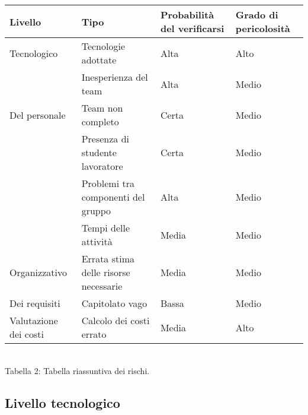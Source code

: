 \begin{center}
	\begin{tabular}{| >{\centering\arraybackslash}m{1in} | >{\centering\arraybackslash}m{1in} | >{\centering\arraybackslash}m{1in} | >{\centering\arraybackslash}m{1in} |}
		\hline
		\textbf{Livello} & \textbf{Tipo} & \textbf{Probabilità del verificarsi}& \textbf{Grado di pericolosità} \\
		\hline
		Tecnologico & Tecnologie adottate & Alta & Alto\\
		\hline
		& Inesperienza del team & Alta & Medio \\		
		\cline{2-4}
		 Del personale   & Team non completo & Certa & Medio \\
		 \cline{2-4}
		& Presenza di studente lavoratore & Certa & Medio \\
		 \cline{2-4}
		 & Problemi tra componenti del gruppo & Alta & Medio \\
		 \hline
		 & Tempi delle attività & Media & Medio \\
		 \cline{2-4}
		Organizzativo  & Errata stima delle risorse necessarie & Media & Medio \\
		 \hline
		 Dei requisiti & Capitolato vago & Bassa & Medio \\
		 \hline
		 Valutazione dei costi & Calcolo dei costi errato & Media & Alto \\
		 \hline
	\end{tabular}
	\\
	Tabella 2: Tabella riassuntiva dei rischi.
\end{center}
\subsection{Livello tecnologico}
